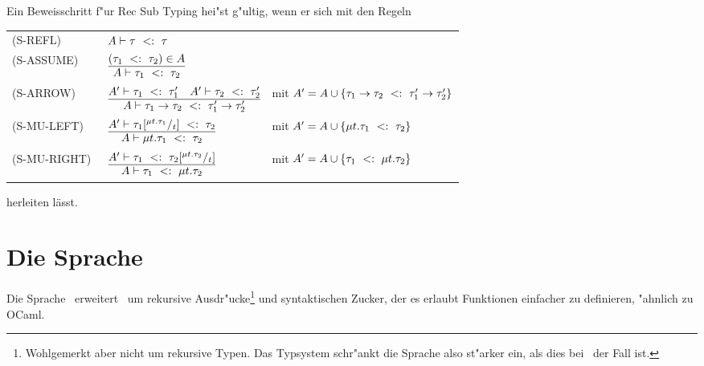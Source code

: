 Ein Beweisschritt f"ur Rec Sub Typing hei"st g"ultig, wenn er sich mit den Regeln  \\[5mm]
 \begin{tabular}{lll}
            \mbox{(S-REFL)\ } & $A \vdash \tau\ <:\ \tau$ \\[1mm]
            \mbox{(S-ASSUME)\ } & $\RULE{(\subtype{\tau_1} {\tau_2)} \in A}
                                   {A \vdash \subtype{\tau_1} {\tau_2}}$ \\[2mm]
            \mbox{(S-ARROW)\ } & $\RULE{A' \vdash \subtype{\tau_1} {\tau_1'}
                                   \quad
                                   A' \vdash \subtype{\tau_2} {\tau_2'}}
                                  {A \vdash \subtype{\typeArrow{\tau_1}{\tau_2}}
                                   {\typeArrow{\tau_1'}{\tau_2'}}}$ 
                                  & mit $A' = A \cup \{\tau_1\to\tau_2\ <:\ \tau_1'\to\tau_2'\}$ \\[2mm]
            \mbox{(S-MU-LEFT)\ } & $\RULE{A' \vdash \subtype{\tau_1\SUB{\typeRec{t}{\tau_1}}{t}}
                                     {\tau_2}}
                                    {A \vdash \subtype{\typeRec{t}{\tau_1}} {\tau_2}}$
                                   & mit $A' = A \cup \{\mu t.\tau_1\ <:\ \tau_2\}$ \\[2mm]
            \mbox{(S-MU-RIGHT)\ } & $\RULE{A' \vdash \subtype{\tau_1}
                                     {\tau_2\SUB{\typeRec{t}{\tau_2}}{t}}}
                                    {A \vdash \subtype{\tau_1} {\typeRec{t}{\tau_2}}}$
                                   & mit $A' = A \cup \{\tau_1\ <:\ \mu t.\tau_2\}$ \\[2mm]
          \end{tabular}


herleiten l\"asst.



\section{Die Sprache \LTWO}

Die Sprache \LTWO\ erweitert \LONE\ um rekursive Ausdr"ucke\footnote{Wohlgemerkt aber nicht um rekursive Typen. Das
Typsystem schr"ankt die Sprache also st"arker ein, als dies bei \LONE\ der Fall ist.} und syntaktischen Zucker, der
es erlaubt Funktionen einfacher zu definieren, "ahnlich zu OCaml.

